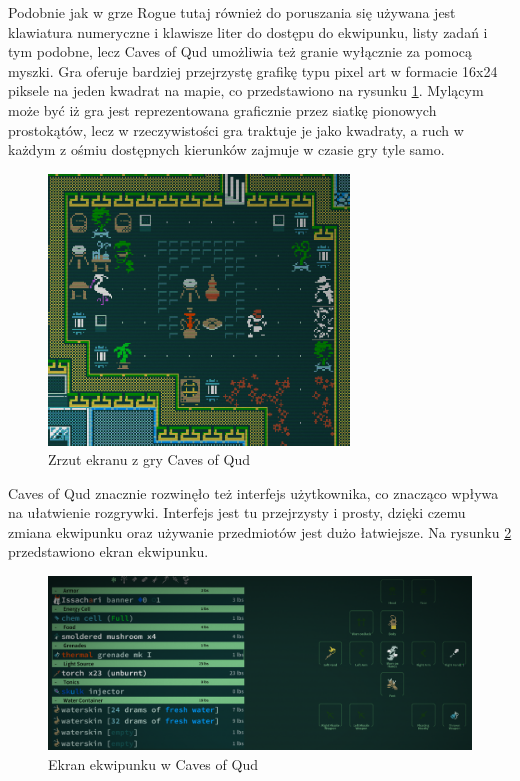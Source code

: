 \documentclass[12pt,twoside]{article}
\begin{document}
Podobnie jak w grze Rogue tutaj również do poruszania się używana jest klawiatura numeryczne i klawisze liter do dostępu do ekwipunku, listy zadań i tym podobne, lecz Caves of Qud umożliwia też granie wyłącznie za pomocą myszki. Gra oferuje bardziej przejrzystę grafikę typu pixel art w formacie 16x24 piksele na jeden kwadrat na mapie, co przedstawiono na rysunku \ref{CoQ:scr3}. Mylącym może być iż gra jest reprezentowana graficznie przez siatkę pionowych prostokątów, lecz w rzeczywistości gra traktuje je jako kwadraty, a ruch w każdym z ośmiu dostępnych kierunków zajmuje w czasie gry tyle samo.

\FloatBarrier
\begin{figure}[h]
	\centering
	\includegraphics[width=8cm]{images/caves_of_qud/scr3.png}
	\caption{Zrzut ekranu z gry Caves of Qud}
	\label{CoQ:scr3}
\end{figure}
\FloatBarrier

Caves of Qud znacznie rozwinęło też interfejs użytkownika, co znacząco wpływa na ułatwienie rozgrywki. Interfejs jest tu przejrzysty i prosty, dzięki czemu zmiana ekwipunku oraz używanie przedmiotów jest dużo łatwiejsze. Na rysunku \ref{CoQ:scr2} przedstawiono ekran ekwipunku.

\FloatBarrier
\begin{figure}[h]
	\centering
	\includegraphics[width=14cm]{images/caves_of_qud/scr2.png}
	\caption{Ekran ekwipunku w Caves of Qud}
	\label{CoQ:scr2}
\end{figure}
\FloatBarrier
\end{document}
